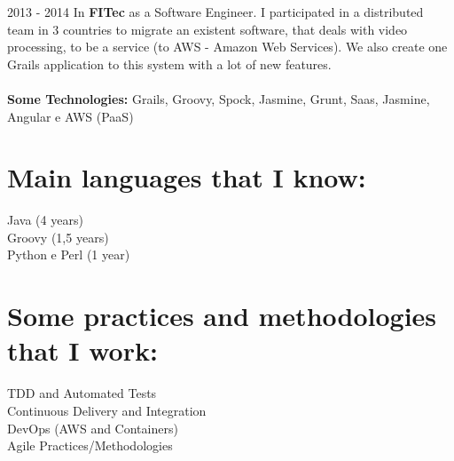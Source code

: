 \documentclass[]{friggeri-cv}
\begin{document}
\newpage
\begin{entrylist}  
  \entry
    {2013 - 2014}
    {{\normalfont In \textbf{FITec} as a Software Engineer. I participated in a distributed team in 3 countries to migrate an existent software, that deals with video processing, to be a service (to AWS - Amazon Web Services). We also create one Grails application to this system with a lot of new features.\\
        \\\textbf{Some Technologies:} Grails, Groovy, Spock, Jasmine, Grunt, Saas, Jasmine, Angular e AWS (PaaS)
    }}{}{}
\end{entrylist}

\section{Main languages that I know:}
Java (4 years)\\
Groovy (1,5 years)\\
Python e Perl (1 year)\\

\section{Some practices and methodologies that I work:}
\begin{multicols}{2}
    TDD and Automated Tests\\
    Continuous Delivery and Integration\\
    DevOps (AWS and Containers)\\
    Agile Practices/Methodologies\\
\end{multicols}
\end{document}
